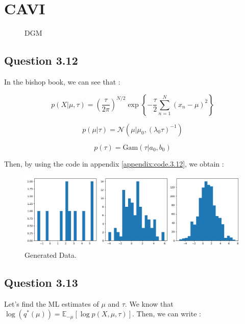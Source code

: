 \documentclass{article}
\begin{document}
\section{CAVI}

\begin{figure}[H]
    \centering
    
    \caption{DGM}
    \label{fig:fig3}
\end{figure}

\subsection*{Question 3.12}

In the bishop book, we can see that :

\begin{equation}
    p(X|\mu, \tau) = \left(\frac{\tau}{2\pi}\right)^{N/2} \exp\left\{-\frac{\tau}{2}\sum_{n=1}^{N}(x_n - \mu)^2\right\}
\end{equation}

\begin{equation}
    p(\mu|\tau) = \mathcal{N}(\mu|\mu_0, (\lambda_0 \tau)^{-1})
\end{equation}

\begin{equation}
    p(\tau) = \text{Gam}(\tau|a_0, b_0)
\end{equation}

Then, by using the code in appendix \ref{appendix:code.3.12}, we obtain :

\begin{figure}[H]
    \centering
    \includegraphics[scale=0.5]{py_files/12_data.png}
    \caption{Generated Data.}
    \label{fig:3.12}
\end{figure}

\subsection*{Question 3.13}

Let's find the ML estimates of $\mu$ and $\tau$.
We know that $\log(q^*(\mu)) = \mathbb{E}_{-\mu}[\log p(X, \mu, \tau)]$.
Then, we can write :
\end{document}
